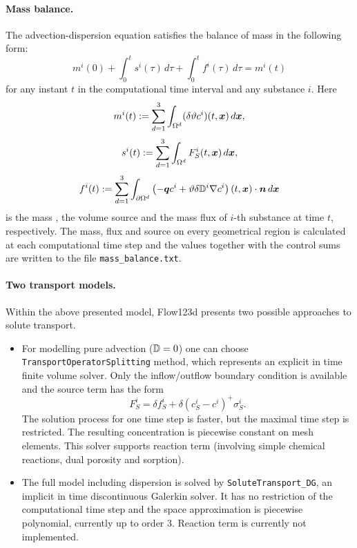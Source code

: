 \paragraph{Mass balance.}
The advection-dispersion equation satisfies the balance of mass in the following form:
$$ m^i(0) + \int_0^t s^i(\tau) \,d\tau + \int_0^t f^i(\tau) \,d\tau = m^i(t) $$
for any instant $t$ in the computational time interval and any substance $i$.
Here
$$ m^i(t) := \sum_{d=1}^3\int_{\Omega^d}(\delta\vartheta c^i)(t,\mathbf{\boldsymbol{x}})\,d\mathbf{\boldsymbol{x}}, $$
$$ s^i(t) := \sum_{d=1}^3\int_{\Omega^d}F_S^i(t,\mathbf{\boldsymbol{x}})\,d\mathbf{\boldsymbol{x}}, $$
$$ f^i(t) := \sum_{d=1}^3\int_{\partial\Omega^d}\left(-\mathbf{\boldsymbol{q}} c^i + \vartheta\delta{{\mathbb{D}}}^i\nabla c^i\right)(t,\mathbf{\boldsymbol{x}})\cdot\mathbf{\boldsymbol{n}} \,d\mathbf{\boldsymbol{x}} $$
is the mass , the volume source  and the mass flux  of $i$-th substance at time $t$, respectively.
The mass, flux and source on every geometrical region is calculated at each computational time step and the values together with the control sums are written to the file \texttt{mass\_balance.txt}.


\paragraph{Two transport models.}
Within the above presented model, Flow123d presents two possible approaches to solute transport.
\begin{itemize}
\item For modelling pure advection (${\mathbb{D}}=0$) one can choose {\tt TransportOperatorSplitting} method, which represents an explicit in time finite volume solver. 
Only the inflow/outflow boundary condition is available and the source term has the form
\[ F_S^i = \delta f_S^i + \delta(c_S^i-c^i)^+\sigma_S^i. \]
The solution process for one time step is faster, but the maximal time step is restricted. The resulting concentration is piecewise constant on mesh elements. This solver supports reaction term (involving simple chemical reactions, dual porosity and sorption).
\item The full model including dispersion is solved by {\tt SoluteTransport\_DG}, an implicit in time discontinuous Galerkin solver. It has no restriction of the computational time step and the space approximation is piecewise polynomial, currently up to order 3. Reaction term is currently not implemented.
\end{itemize}



